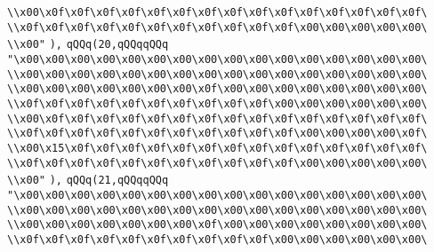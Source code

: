 \verb|\\x00\x0f\x0f\x0f\x0f\x0f\x0f\x0f\x0f\x0f\x0f\x0f\x0f\x0f\x0f\x0f\|\newline
\verb|\\x0f\x0f\x0f\x0f\x0f\x0f\x0f\x0f\x0f\x0f\x0f\x00\x00\x00\x00\x00\|\newline
\verb|\\x00"|\newline
\verb|),|\newline
\verb|qQQq(20,qQQqqQQq|\newline
\verb|"\x00\x00\x00\x00\x00\x00\x00\x00\x00\x00\x00\x00\x00\x00\x00\x00\|\newline
\verb|\\x00\x00\x00\x00\x00\x00\x00\x00\x00\x00\x00\x00\x00\x00\x00\x00\|\newline
\verb|\\x00\x00\x00\x00\x00\x00\x00\x0f\x00\x00\x00\x00\x00\x00\x00\x00\|\newline
\verb|\\x0f\x0f\x0f\x0f\x0f\x0f\x0f\x0f\x0f\x0f\x00\x00\x00\x00\x00\x00\|\newline
\verb|\\x00\x0f\x0f\x0f\x0f\x0f\x0f\x0f\x0f\x0f\x0f\x0f\x0f\x0f\x0f\x0f\|\newline
\verb|\\x0f\x0f\x0f\x0f\x0f\x0f\x0f\x0f\x0f\x0f\x0f\x00\x00\x00\x00\x0f\|\newline
\verb|\\x00\x15\x0f\x0f\x0f\x0f\x0f\x0f\x0f\x0f\x0f\x0f\x0f\x0f\x0f\x0f\|\newline
\verb|\\x0f\x0f\x0f\x0f\x0f\x0f\x0f\x0f\x0f\x0f\x0f\x00\x00\x00\x00\x00\|\newline
\verb|\\x00"|\newline
\verb|),|\newline
\verb|qQQq(21,qQQqqQQq|\newline
\verb|"\x00\x00\x00\x00\x00\x00\x00\x00\x00\x00\x00\x00\x00\x00\x00\x00\|\newline
\verb|\\x00\x00\x00\x00\x00\x00\x00\x00\x00\x00\x00\x00\x00\x00\x00\x00\|\newline
\verb|\\x00\x00\x00\x00\x00\x00\x00\x0f\x00\x00\x00\x00\x00\x00\x00\x00\|\newline
\verb|\\x0f\x0f\x0f\x0f\x0f\x0f\x0f\x0f\x0f\x0f\x00\x00\x00\x00\x00\x00\|\newline
